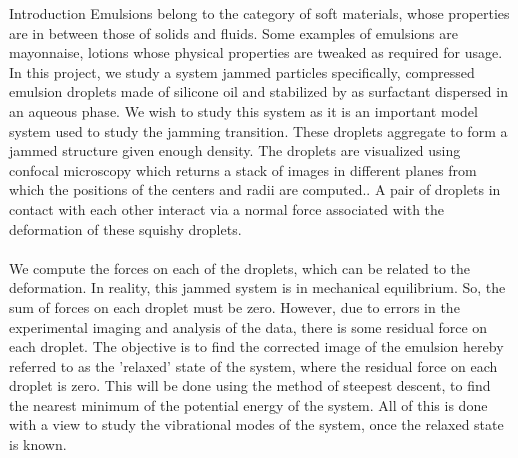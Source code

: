 \documentclass[12pt]{article}
\begin{document}
\begin{section}{Introduction}
Emulsions belong to the category of soft materials, whose properties are in between those of solids and fluids. Some examples of emulsions are mayonnaise, lotions whose physical properties are tweaked as required for usage. In this project, we study a system jammed particles specifically, compressed emulsion droplets\cite{brujic2004experimental} made of silicone oil and stabilized by as surfactant dispersed in an aqueous phase. We wish to study this system as it is an important model system used to study the jamming transition\cite{liu1998nonlinear}. These droplets aggregate to form a jammed structure given enough density. The droplets are visualized using confocal microscopy which returns a stack of images in different planes from which the positions of the centers and radii are computed.\cite{brujic2004experimental}. A pair of droplets in contact with each other interact via a normal force associated with the deformation of these squishy droplets.\\\\ 
We compute the forces on each of the droplets, which can be related to the deformation. In reality, this jammed system is in mechanical equilibrium. So, the sum of forces on each droplet must be zero. However, due to errors in the experimental imaging and analysis of the data, there is some residual force on each droplet. The objective is to find the corrected image of the emulsion hereby referred to as the 'relaxed' state of the system, where the residual force on each droplet is zero. This will be done using the method of steepest descent, to find the nearest minimum of the potential energy of the system. All of this is done with a view to study the vibrational modes of the system, once the relaxed state is known.
\end{section}
\end{document}
